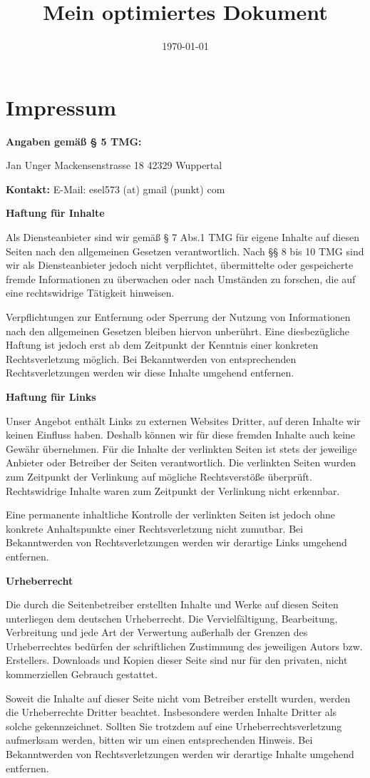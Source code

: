 \documentclass[12pt,a4paper]{scrartcl}
\title{Mein optimiertes Dokument}
\date{\today}
\begin{document}
\maketitle

\hypertarget{impressum}{%
\section{Impressum}\label{impressum}}

\textbf{Angaben gemäß § 5 TMG:}

Jan Unger Mackensenstrasse 18 42329 Wuppertal

\textbf{Kontakt:} E-Mail: esel573 (at) gmail (punkt) com

\textbf{Haftung für Inhalte}

Als Diensteanbieter sind wir gemäß § 7 Abs.1 TMG für eigene Inhalte auf
diesen Seiten nach den allgemeinen Gesetzen verantwortlich. Nach §§ 8
bis 10 TMG sind wir als Diensteanbieter jedoch nicht verpflichtet,
übermittelte oder gespeicherte fremde Informationen zu überwachen oder
nach Umständen zu forschen, die auf eine rechtswidrige Tätigkeit
hinweisen.

Verpflichtungen zur Entfernung oder Sperrung der Nutzung von
Informationen nach den allgemeinen Gesetzen bleiben hiervon unberührt.
Eine diesbezügliche Haftung ist jedoch erst ab dem Zeitpunkt der
Kenntnis einer konkreten Rechtsverletzung möglich. Bei Bekanntwerden von
entsprechenden Rechtsverletzungen werden wir diese Inhalte umgehend
entfernen.

\textbf{Haftung für Links}

Unser Angebot enthält Links zu externen Websites Dritter, auf deren
Inhalte wir keinen Einfluss haben. Deshalb können wir für diese fremden
Inhalte auch keine Gewähr übernehmen. Für die Inhalte der verlinkten
Seiten ist stets der jeweilige Anbieter oder Betreiber der Seiten
verantwortlich. Die verlinkten Seiten wurden zum Zeitpunkt der
Verlinkung auf mögliche Rechtsverstöße überprüft. Rechtswidrige Inhalte
waren zum Zeitpunkt der Verlinkung nicht erkennbar.

Eine permanente inhaltliche Kontrolle der verlinkten Seiten ist jedoch
ohne konkrete Anhaltspunkte einer Rechtsverletzung nicht zumutbar. Bei
Bekanntwerden von Rechtsverletzungen werden wir derartige Links umgehend
entfernen.

\textbf{Urheberrecht}

Die durch die Seitenbetreiber erstellten Inhalte und Werke auf diesen
Seiten unterliegen dem deutschen Urheberrecht. Die Vervielfältigung,
Bearbeitung, Verbreitung und jede Art der Verwertung außerhalb der
Grenzen des Urheberrechtes bedürfen der schriftlichen Zustimmung des
jeweiligen Autors bzw. Erstellers. Downloads und Kopien dieser Seite
sind nur für den privaten, nicht kommerziellen Gebrauch gestattet.

Soweit die Inhalte auf dieser Seite nicht vom Betreiber erstellt wurden,
werden die Urheberrechte Dritter beachtet. Insbesondere werden Inhalte
Dritter als solche gekennzeichnet. Sollten Sie trotzdem auf eine
Urheberrechtsverletzung aufmerksam werden, bitten wir um einen
entsprechenden Hinweis. Bei Bekanntwerden von Rechtsverletzungen werden
wir derartige Inhalte umgehend entfernen. %
\end{document}
